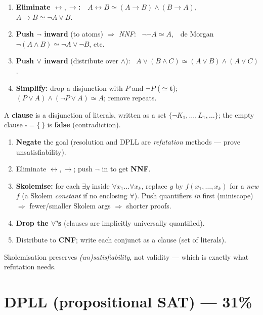 \documentclass[11pt,a4paper]{article}
\newcommand{\imp}{\rightarrow}
\newcommand{\eq}{\simeq}
\newcommand{\T}{\mathbf{t}}
\begin{document}
\begin{must}[title=Propositional CNF (4 steps)]
\begin{enumerate}[leftmargin=*,itemsep=0pt]
  \item \textbf{Eliminate $\leftrightarrow,\imp$:}\ \ $A\leftrightarrow B \eq (A\imp B)\wedge(B\imp A)$, \ \ $A\imp B\eq \neg A\vee B$.
  \item \textbf{Push $\neg$ inward} (to atoms) $\Rightarrow$ \emph{NNF}: \ $\neg\neg A\eq A$,\ \ de Morgan $\neg(A\wedge B)\eq\neg A\vee\neg B$, etc.
  \item \textbf{Push $\vee$ inward} (distribute over $\wedge$): \ $A\vee(B\wedge C)\eq(A\vee B)\wedge(A\vee C)$.
  \item \textbf{Simplify:} drop a disjunction with $P$ and $\neg P$ ($\eq\T$); $(P\vee A)\wedge(\neg P\vee A)\eq A$; remove repeats.
\end{enumerate}
A \textbf{clause} is a disjunction of literals, written as a set $\{\neg K_1,\dots,L_1,\dots\}$; the empty clause $\square=\{\,\}$ is \textbf{false} (contradiction).
\end{must}

\begin{must}[title=First-order clause form (for resolution)]
\begin{enumerate}[leftmargin=*,itemsep=0pt]
  \item \textbf{Negate} the goal (resolution and DPLL are \emph{refutation} methods --- prove unsatisfiability).
  \item Eliminate $\leftrightarrow,\imp$; push $\neg$ in to get \textbf{NNF}.
  \item \textbf{Skolemise:} for each $\exists y$ inside $\forall x_1\dots\forall x_k$, replace $y$ by $f(x_1,\dots,x_k)$ for a \emph{new} $f$ (a Skolem \emph{constant} if no enclosing $\forall$). Push quantifiers \emph{in} first (miniscope) $\Rightarrow$ fewer/smaller Skolem args $\Rightarrow$ shorter proofs.
  \item \textbf{Drop the $\forall$'s} (clauses are implicitly universally quantified).
  \item Distribute to \textbf{CNF}; write each conjunct as a clause (set of literals).
\end{enumerate}
Skolemisation preserves \emph{(un)satisfiability}, not validity --- which is exactly what refutation needs.
\end{must}

\section{DPLL (propositional SAT) --- 31\%}
\end{document}

